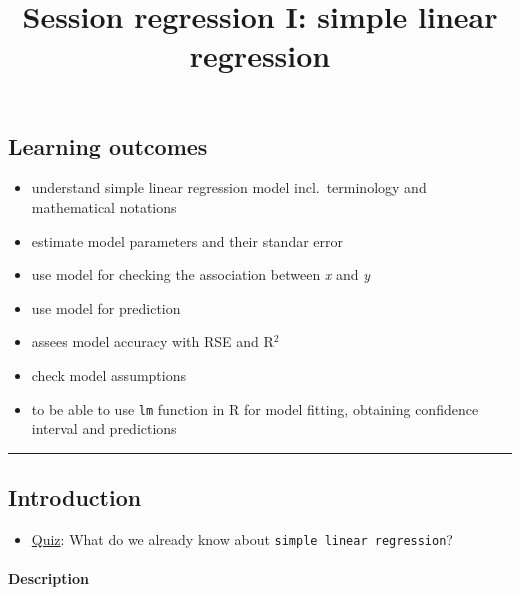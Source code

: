 \documentclass[]{article}
\title{Session regression I: simple linear regression}
\author{}
\date{}
\providecommand{\tightlist}{%
  \setlength{\itemsep}{0pt}\setlength{\parskip}{0pt}}
\let\oldparagraph\paragraph
\renewcommand{\paragraph}[1]{\oldparagraph{#1}\mbox{}}
\begin{document}
\maketitle

\hypertarget{learning-outcomes}{%
\subsection{Learning outcomes}\label{learning-outcomes}}

\begin{itemize}
\tightlist
\item
  understand simple linear regression model incl.~terminology and
  mathematical notations
\item
  estimate model parameters and their standar error
\item
  use model for checking the association between \emph{x} and \emph{y}
\item
  use model for prediction
\item
  assees model accuracy with RSE and R\(^2\)
\item
  check model assumptions
\item
  to be able to use \texttt{lm} function in R for model fitting,
  obtaining confidence interval and predictions
\end{itemize}

\begin{center}\rule{0.5\linewidth}{\linethickness}\end{center}

\hypertarget{introduction}{%
\subsection{Introduction}\label{introduction}}

\begin{itemize}
\tightlist
\item
  \href{https://forms.gle/bHZr1MP454npysAFA}{Quiz}: What do we already
  know about \texttt{simple\ linear\ regression}?
\end{itemize}

\hypertarget{description}{%
\paragraph{Description}\label{description}}
\end{document}
